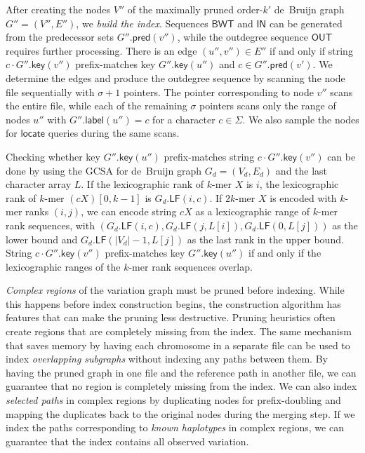 \documentclass[twoside,leqno,twocolumn]{article}
\newcommand{\abs}[1]{\ensuremath{\lvert #1 \rvert}}
\newcommand{\LF}{\ensuremath{\mathsf{LF}}}
\newcommand{\locate}{\ensuremath{\mathsf{locate}}}
\newcommand{\glabel}{\ensuremath{\mathsf{label}}}
\newcommand{\gpred}{\ensuremath{\mathsf{pred}}}
\newcommand{\gkey}{\ensuremath{\mathsf{key}}}
\newcommand{\kmer}[1]{$#1$\nobreakdash-mer}
\newcommand{\orderk}[1]{order\nobreakdash-$#1$}
\newcommand{\BWT}{\ensuremath{\mathsf{BWT}}}
\newcommand{\bvIN}{\ensuremath{\mathsf{IN}}}
\newcommand{\bvOUT}{\ensuremath{\mathsf{OUT}}}
\begin{document}
After creating the nodes $V''$ of the maximally pruned \orderk{k'} de~Bruijn graph $G'' = (V'', E'')$, we \emph{build the index}. Sequences $\BWT$ and $\bvIN$ can be generated from the predecessor sets $G''.\gpred(v'')$, while the outdegree sequence $\bvOUT$ requires further processing. There is an edge $(u'', v'') \in E''$ if and only if string $c \cdot G''.\gkey(v'')$ prefix-matches key $G''.\gkey(u'')$ and $c \in G''.\gpred(v')$. We determine the edges and produce the outdegree sequence by scanning the node file sequentially with $\sigma+1$ pointers. The pointer corresponding to node $v''$ scans the entire file, while each of the remaining $\sigma$ pointers scans only the range of nodes $u''$ with $G''.\glabel(u'') = c$ for a character $c \in \Sigma$. We also sample the nodes for $\locate$ queries during the same scans.

Checking whether key $G''.\gkey(u'')$ prefix-matches string $c \cdot G''.\gkey(v'')$ can be done by using the GCSA for de~Bruijn graph $G_{d} = (V_{d}, E_{d})$ and the last character array $L$. If the lexicographic rank of \kmer{k} $X$ is $i$, the lexicographic rank of \kmer{k} $(cX)[0, k-1]$ is $G_{d}.\LF(i, c)$. If \kmer{2k} $X$ is encoded with \kmer{k} ranks $(i, j)$, we can encode string $cX$ as a lexicographic range of \kmer{k} rank sequences, with $(G_{d}.\LF(i, c), G_{d}.\LF(j, L[i]), G_{d}.\LF(0, L[j]))$ as the lower bound and $G_{d}.\LF(\abs{V_{d}}-1, L[j])$ as the last rank in the upper bound. String $c \cdot G''.\gkey(v'')$ prefix-matches key $G''.\gkey(u'')$ if and only if the lexicographic ranges of the \kmer{k} rank sequences overlap.

\emph{Complex regions} of the variation graph must be pruned before indexing. While this happens before index construction begins, the construction algorithm has features that can make the pruning less destructive. Pruning heuristics often create regions that are completely missing from the index. The same mechanism that saves memory by having each chromosome in a separate file can be used to index \emph{overlapping subgraphs} without indexing any paths between them. By having the pruned graph in one file and the reference path in another file, we can guarantee that no region is completely missing from the index. We can also index \emph{selected paths} in complex regions by duplicating nodes for prefix-doubling and mapping the duplicates back to the original nodes during the merging step. If we index the paths corresponding to \emph{known haplotypes} in complex regions, we can guarantee that the index contains all observed variation.
\end{document}
